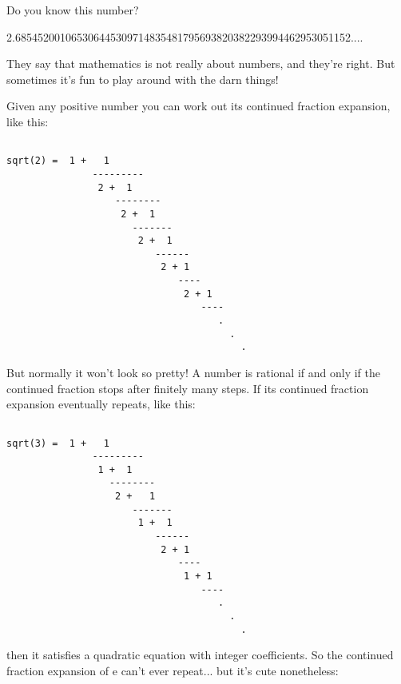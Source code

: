

Do you know this number?

2.685452001065306445309714835481795693820382293994462953051152....

They say that mathematics is not really about numbers, and 
they're right.  But sometimes it's fun to play around with 
the darn things!  

Given any positive number you can work out its continued 
fraction expansion, like this:


\begin{verbatim}

sqrt(2) =  1 +   1
               ---------
                2 +  1
                   -------- 
                    2 +  1
                      -------
                       2 +  1
                          ------
                           2 + 1
                              ----  
                               2 + 1
                                  ----
                                     .
                                       .
                                         .

\end{verbatim}
    
But normally it won't look so pretty!  A number is rational if
and only if the continued fraction stops after finitely many steps.  
If its continued fraction expansion eventually repeats, like this:


\begin{verbatim}

sqrt(3) =  1 +   1
               ---------
                1 +  1
                  -------- 
                   2 +   1
                      -------
                       1 +  1
                          ------
                           2 + 1
                              ----  
                               1 + 1
                                  ----
                                     .
                                       .
                                         .
\end{verbatim}
    
then it satisfies a quadratic equation with integer coefficients.  
So the continued fraction expansion of e can't ever repeat... but
it's cute nonetheless:


